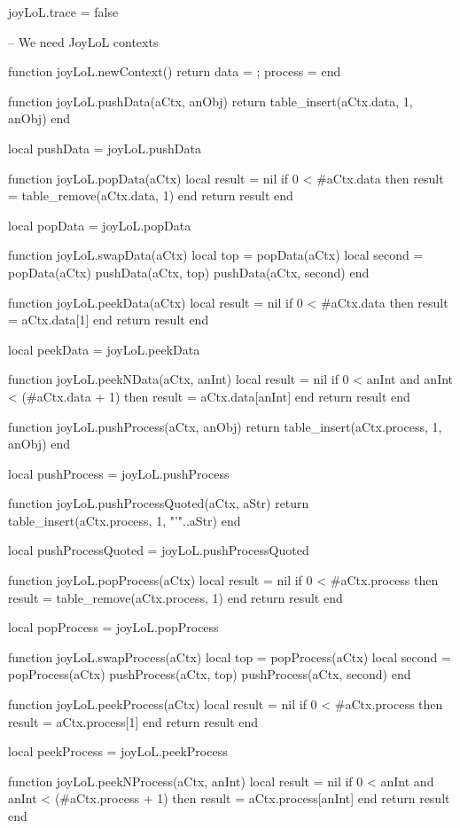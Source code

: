 joyLoL.trace = false

-- We need JoyLoL contexts

function joyLoL.newContext()
  return { data = { }; process = { } }
end

function joyLoL.pushData(aCtx, anObj)
  return table_insert(aCtx.data, 1, anObj)
end

local pushData = joyLoL.pushData

function joyLoL.popData(aCtx)
  local result = nil
  if 0 < #aCtx.data then
    result = table_remove(aCtx.data, 1)
  end
  return result
end

local popData = joyLoL.popData

function joyLoL.swapData(aCtx)
  local top    = popData(aCtx)
  local second = popData(aCtx)
  pushData(aCtx, top)
  pushData(aCtx, second)
end

function joyLoL.peekData(aCtx)
  local result = nil
  if 0 < #aCtx.data then
    result = aCtx.data[1]
  end
  return result
end

local peekData = joyLoL.peekData

function joyLoL.peekNData(aCtx, anInt)
  local result = nil
  if 0 < anInt and anInt < (#aCtx.data + 1) then
    result = aCtx.data[anInt]
  end
  return result
end

function joyLoL.pushProcess(aCtx, anObj)
  return table_insert(aCtx.process, 1, anObj)
end

local pushProcess = joyLoL.pushProcess

function joyLoL.pushProcessQuoted(aCtx, aStr)
  return table_insert(aCtx.process, 1, "'"..aStr)
end

local pushProcessQuoted = joyLoL.pushProcessQuoted

function joyLoL.popProcess(aCtx)
  local result = nil
  if 0 < #aCtx.process then
    result = table_remove(aCtx.process, 1)
  end
  return result
end

local popProcess = joyLoL.popProcess

function joyLoL.swapProcess(aCtx)
  local top    = popProcess(aCtx)
  local second = popProcess(aCtx)
  pushProcess(aCtx, top)
  pushProcess(aCtx, second)
end

function joyLoL.peekProcess(aCtx)
  local result = nil
  if 0 < #aCtx.process then
    result = aCtx.process[1]
  end
  return result
end

local peekProcess = joyLoL.peekProcess

function joyLoL.peekNProcess(aCtx, anInt)
  local result = nil
  if 0 < anInt and anInt < (#aCtx.process + 1) then
    result = aCtx.process[anInt]
  end
  return result
end

